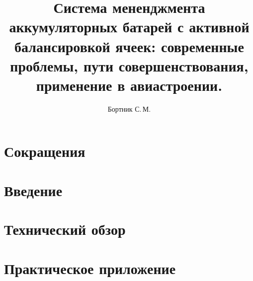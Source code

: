 \documentclass{mipt-thesis-bs}
\title{Система мененджмента аккумуляторных батарей с активной балансировкой ячеек: современные проблемы, пути совершенствования, применение в авиастроении.}
\author{Бортник С.\,М.}
\begin{document}
% 

\frontmatter
\titlecontents

\chapter{Сокращения}
\printacronyms[heading=none]



\mainmatter

\chapter{Введение}


\chapter{Технический обзор}


\chapter{Практическое приложение}


\backmatter

\chapter{\bibname}
\printbibliography[heading=none]


\chapter{\appendixname}

\end{document}
